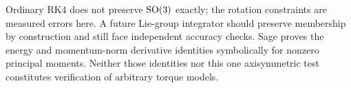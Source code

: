 Ordinary RK4 does not preserve $\operatorname{SO}(3)$ exactly; the rotation constraints are
measured errors here. A future Lie-group integrator should preserve membership
by construction and still face independent accuracy checks. Sage proves the
energy and momentum-norm derivative identities symbolically for nonzero
principal moments. Neither those identities nor this one axisymmetric test
constitutes verification of arbitrary torque models.
